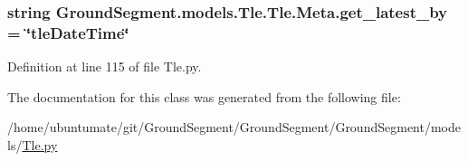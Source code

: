 \subsubsection[{get\+\_\+latest\+\_\+by}]{\setlength{\rightskip}{0pt plus 5cm}string Ground\+Segment.\+models.\+Tle.\+Tle.\+Meta.\+get\+\_\+latest\+\_\+by = \char`\"{}tle\+Date\+Time\char`\"{}\hspace{0.3cm}{\ttfamily [static]}}\label{class_ground_segment_1_1models_1_1_tle_1_1_tle_1_1_meta_a4b90de3b4688d9ff38172b5318c4be66}


Definition at line 115 of file Tle.\+py.



The documentation for this class was generated from the following file\+:\begin{DoxyCompactItemize}
\item 
/home/ubuntumate/git/\+Ground\+Segment/\+Ground\+Segment/\+Ground\+Segment/models/\hyperlink{_tle_8py}{Tle.\+py}\end{DoxyCompactItemize}
